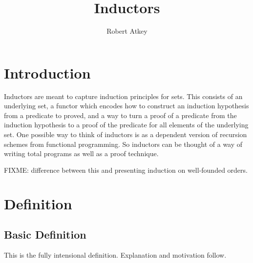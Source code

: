 \documentclass{amsart}
\title{Inductors}
\author{Robert Atkey}
\begin{document}
\maketitle

\tableofcontents

\section{Introduction}

Inductors are meant to capture induction principles for sets. This
consists of an underlying set, a functor which encodes how to
construct an induction hypothesis from a predicate to proved, and a
way to turn a proof of a predicate from the induction hypothesis to a
proof of the predicate for all elements of the underlying set. One
possible way to think of inductors is as a dependent version of
recursion schemes from functional programming. So inductors can be
thought of a way of writing total programs as well as a proof
technique.

FIXME: difference between this and presenting induction on
well-founded orders.

\section{Definition}

\subsection{Basic Definition}

This is the fully intensional definition. Explanation and motivation
follow.

\newcommand{\truth}{\mathsf{tr}}
\newcommand{\ind}{\mathsf{ind}}
\newcommand{\all}{\mathsf{all}}
\end{document}
